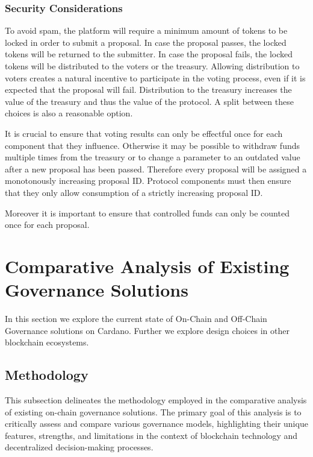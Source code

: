 \documentclass[11pt]{article}
\begin{document}
\subsubsection{Security Considerations}

To avoid spam, the platform will require a minimum amount of tokens to be locked in order to submit a proposal.
In case the proposal passes, the locked tokens will be returned to the submitter.
In case the proposal fails, the locked tokens will be distributed to the voters or the treasury.
Allowing distribution to voters creates a natural incentive to participate in the voting process, even if it is expected that the proposal will fail.
Distribution to the treasury increases the value of the treasury and thus the value of the protocol.
A split between these choices is also a reasonable option.

It is crucial to ensure that voting results can only be effectful once for each component that they influence.
Otherwise it may be possible to withdraw funds multiple times from the treasury or to change a parameter to an outdated value after a new proposal has been passed.
Therefore every proposal will be assigned a monotonously increasing proposal ID.
Protocol components must then ensure that they only allow consumption of a strictly increasing proposal ID.

Moreover it is important to ensure that controlled funds can only be counted once for each proposal.

\section{Comparative Analysis of Existing Governance Solutions}

In this section we explore the current state of On-Chain and Off-Chain Governance solutions on Cardano.
Further we explore design choices in other blockchain ecosystems.

\subsection{Methodology}
This subsection delineates the methodology employed in the comparative analysis of existing on-chain governance solutions.
The primary goal of this analysis is to critically assess and compare various governance models,
highlighting their unique features, strengths, and limitations in the context of blockchain technology and decentralized decision-making processes.
\end{document}

